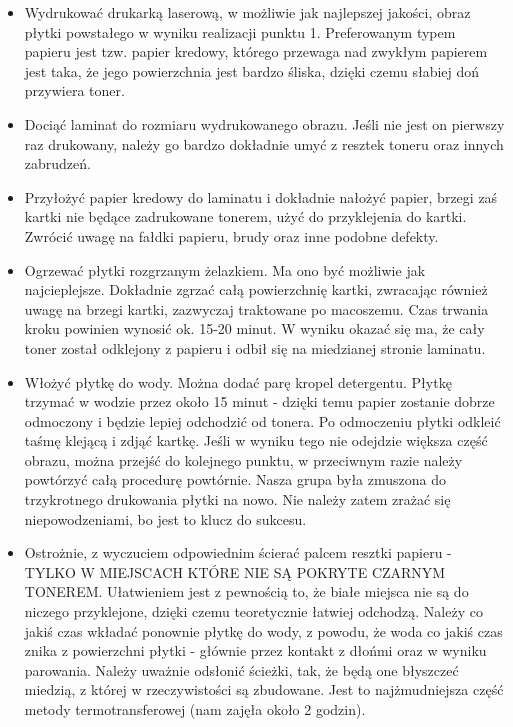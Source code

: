 \begin{itemize}
\item Wydrukować drukarką laserową, w możliwie jak najlepszej jakości, obraz płytki powstałego w wyniku realizacji punktu 1. Preferowanym typem papieru jest tzw. papier kredowy, którego przewaga nad zwykłym papierem jest taka, że  jego powierzchnia jest bardzo śliska, dzięki czemu słabiej doń przywiera toner.
\item Dociąć laminat do rozmiaru wydrukowanego obrazu. Jeśli nie jest on pierwszy raz drukowany, należy go bardzo dokładnie umyć z resztek toneru oraz innych zabrudzeń.
\item Przyłożyć papier kredowy do laminatu i dokładnie nałożyć papier, brzegi zaś kartki nie będące zadrukowane tonerem, użyć do przyklejenia do kartki. Zwrócić uwagę na fałdki papieru, brudy oraz inne podobne defekty.
\item Ogrzewać płytki rozgrzanym żelazkiem. Ma ono być możliwie jak najcieplejsze. Dokładnie zgrzać całą powierzchnię kartki, zwracając również uwagę na brzegi kartki, zazwyczaj traktowane po macoszemu. Czas trwania kroku powinien wynosić ok. 15-20 minut. W wyniku okazać się ma, że cały toner został odklejony z papieru i odbił się na miedzianej stronie laminatu.
\item Włożyć płytkę do wody. Można dodać parę kropel detergentu. Płytkę trzymać w wodzie przez około 15 minut - dzięki temu papier zostanie dobrze odmoczony i będzie lepiej odchodzić od tonera. Po odmoczeniu płytki odkleić taśmę klejącą i zdjąć kartkę. Jeśli w wyniku tego nie odejdzie większa część obrazu, można przejść do kolejnego punktu, w przeciwnym razie należy powtórzyć całą procedurę powtórnie. Nasza grupa była zmuszona do trzykrotnego drukowania płytki na nowo. Nie należy zatem zrażać się niepowodzeniami, bo jest to klucz do sukcesu.
\item Ostrożnie, z wyczuciem odpowiednim ścierać palcem resztki papieru - TYLKO W MIEJSCACH KTÓRE NIE SĄ POKRYTE CZARNYM TONEREM. Ułatwieniem jest z pewnością to, że białe miejsca nie są do niczego przyklejone, dzięki czemu teoretycznie łatwiej odchodzą. Należy co jakiś czas wkładać ponownie płytkę do wody, z powodu, że woda co jakiś czas znika z powierzchni płytki - głównie przez kontakt z dłońmi oraz w wyniku parowania. Należy uważnie odsłonić ścieżki, tak, że będą one błyszczeć miedzią, z której w rzeczywistości są zbudowane. Jest to najżmudniejsza część metody termotransferowej (nam zajęła około 2 godzin).
\end{itemize}

